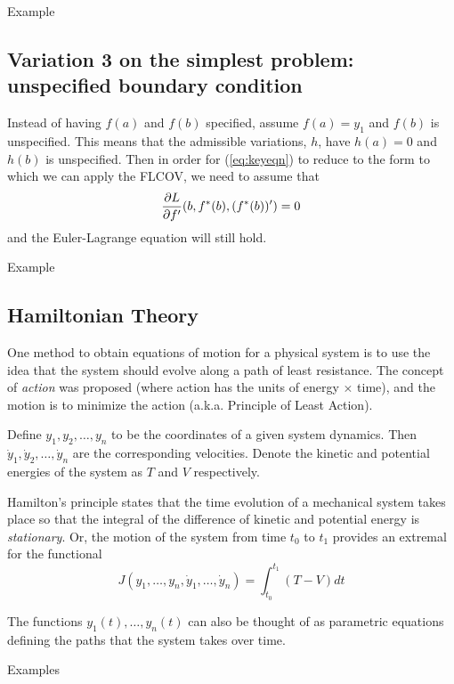 \medskip



\noindent Example
\newpage

\subsection{Variation 3 on the simplest problem:  unspecified boundary condition} Instead of having $f(a)$ and $f(b)$ specified, assume $f(a) = y_1$ and $f(b)$ is unspecified. This means that the admissible variations, $h$, have $h(a) = 0$ and $h(b)$ is unspecified. Then in order for (\ref{eq:keyeqn}) to reduce to the form to which we can apply the FLCOV, we need to assume that 
$$\frac{\partial L}{\partial f'}(b, f^*(b), (f^*(b))') = 0$$
and the Euler-Lagrange equation will still hold. 

Example

\newpage
\subsection{Hamiltonian Theory}
One method to obtain equations of motion for a physical system is to use the idea that the system should evolve along a path of least resistance. The concept of {\it action} was proposed (where action has the units of energy $\times$ time), and the motion is to minimize the action (a.k.a. Principle of Least Action).

Define $y_1, y_2, \ldots, y_n$ to be the coordinates of a given system dynamics. Then $\dot y_1, \dot y_2, \ldots, \dot y_n$ are the corresponding velocities. Denote the kinetic and potential energies of the system as $T$ and $V$ respectively.
\smallskip

\noindent Hamilton's principle states that the time evolution of a mechanical system takes place so that the integral of the difference of kinetic and potential energy is {\it stationary}.  Or, the motion of the system from time $t_0$ to $t_1$ provides an extremal for the functional
$$J(y_1, \ldots, y_n, \dot y_1, \ldots, \dot y_n) = \int_{t_0}^{t_1} (T-V)dt$$

The functions $y_1(t), \ldots, y_n(t)$ can also be thought of as parametric equations defining the paths that the system takes over time.

\medskip

Examples


